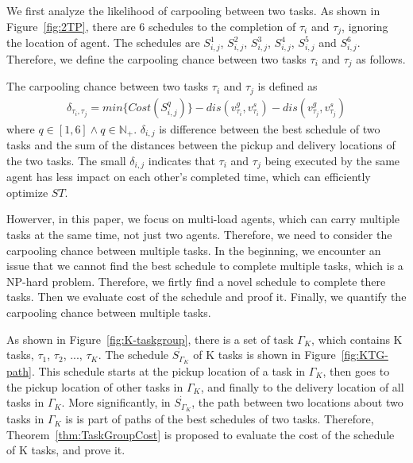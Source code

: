 \documentclass[sigconf,anonymous]{aamas}
\begin{document}
We first analyze the likelihood of carpooling between two tasks.
As shown in Figure~\ref{fig:2TP}, there are 6 schedules to the completion of $\tau_{i}$ and $\tau_{j}$, 
ignoring the location of agent.
The schedules are $S^{1}_{i,j}$, $S^{2}_{i,j}$, $S^{3}_{i,j}$, $S^{4}_{i,j}$, $S^{5}_{i,j}$ and $S^{6}_{i,j}$.
Therefore, we define the carpooling chance between two tasks $\tau_{i}$ and $\tau_{j}$ as follows.

\begin{definition}
\label{cp2}
    The carpooling chance between two tasks $\tau_{i}$ and $\tau_{j}$ is defined as 
    \begin{eqnarray}
    \label{eq:cp2}
        \delta_{\tau_{i}, \tau_{j}} = min\{Cost(S^{q}_{i,j})\} - 
        dis(v^{g}_{\tau_{i}}, v^{s}_{\tau_{i}}) - dis(v^{g}_{\tau_{j}}, v^{s}_{\tau_{j}})
    \end{eqnarray}
    where $q \in [1, 6] \wedge q \in \mathbb{N_+}$. $\delta_{i,j}$ is difference 
    between the best schedule of two tasks 
    and the sum of the distances between the pickup and delivery locations of the two tasks.
    The small $\delta_{i,j}$ indicates that $\tau_{i}$ and $\tau_{j}$ being executed by the same agent
    has less impact on each other's completed time, which can efficiently optimize ${ST}$.
\end{definition}

Howerver, in this paper, we focus on multi-load agents, 
which can carry multiple tasks at the same time, not just two agents.
Therefore, we need to consider the carpooling chance between multiple tasks.
In the beginning, we encounter an issue 
that we cannot find the best schedule to complete multiple tasks, 
which is a NP-hard problem.
Therefore, we firtly find a novel schedule to complete there tasks.
Then we evaluate cost of the schedule and proof it.
Finally, we quantify the carpooling chance between multiple tasks.

As shown in Figure~\ref{fig:K-taskgroup}, there is a set of task $\Gamma_K$, 
which contains K tasks, $\tau_{1}$, $\tau_{2}$, ..., $\tau_{K}$.
The schedule $\dot{S_{\Gamma_K}}$ of K tasks is shown in Figure~\ref{fig:KTG-path}.
This schedule starts at the pickup location of a task in $\Gamma_K$, 
then goes to the pickup location of other tasks in $\Gamma_K$, 
and finally to the delivery location of all tasks in $\Gamma_K$.
More significantly, in $\dot{S_{\Gamma_K}}$,
the path between two locations about two tasks in $\Gamma_K$ 
is is part of paths of the best schedules of two tasks.
Therefore, Theorem~\ref{thm:TaskGroupCost} is proposed to evaluate the cost of the schedule of K tasks,
and prove it.
\end{document}
